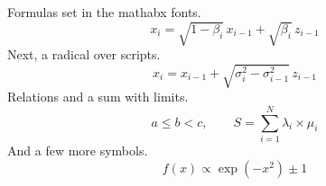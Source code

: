\documentclass{article}
\begin{document}
Formulas set in the mathabx fonts.
\begin{equation}
x_i = \sqrt{1-\beta_i}\, x_{i-1} + \sqrt{\beta_i}\, z_{i-1}
\end{equation}
Next, a radical over scripts.
\[ x_i = x_{i-1} + \sqrt{\sigma_i^2 - \sigma_{i-1}^2}\, z_{i-1} \]
Relations and a sum with limits.
\[ a \leq b < c, \qquad S = \sum_{i=1}^{N} \lambda_i \times \mu_i \]
And a few more symbols.
\[ f(x) \propto \exp(-x^2) \pm 1 \]
\end{document}
